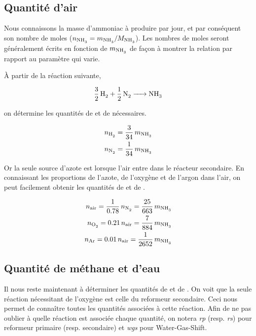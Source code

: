 \subsection{Quantité d'air}

Nous connaissons la masse d'ammoniac à produire par jour, 
et par conséquent son nombre de moles ($n_{\ce{NH3}} = m_{\ce{NH3}}/M_{\ce{NH3}}$).
Les nombres de moles seront généralement écrits en fonction de $m_{\ce{NH3}}$ 
de façon à montrer la relation par rapport au paramètre qui varie.

À partir de la réaction suivante,

\begin{equation*}
	\ce{\frac{3}{2} \, H2 + \frac{1}{2} \, N2 -> NH3} 
\end{equation*}

on détermine les quantités de  et de  nécessaires.

\begin{align}
	n_{\ce{H2}} = \frac{3}{34} \, m_{\ce{NH3}} 
	\label{eq:moles_H2} \\
	n_{\ce{N2}} = \frac{1}{34} \, m_{\ce{NH3}} \nonumber
\end{align}

Or la seule source d'azote est lorsque l'air entre dans le réacteur secondaire.
En connaissant les proportions de l'azote, de l'oxygène et de l'argon dans 
l'air, on peut facilement obtenir les quantités de  et de .

\begin{align*}
	n_{\text{air}} = \frac{1}{0.78} \, n_{\ce{N2}} = \frac{25}{663} \, m_{\ce{NH3}} \\
	n_{\ce{O2}} = 0.21 \, n_{\text{air}} = \frac{7}{884} \, m_{\ce{NH3}} \\
	n_{\ce{Ar}} = 0.01 \, n_{\text{air}} = \frac{1}{2652} \, m_{\ce{NH3}} 
\end{align*}

\subsection{Quantité de méthane et d'eau}

Il nous reste maintenant à déterminer les quantités de  et de .
On voit que la seule réaction nécessitant de l'oxygène est celle du 
reformeur secondaire. Ceci nous permet de conna\^itre toutes les quantités 
associées à cette réaction. 
Afin de ne pas oublier à quelle réaction est associée chaque quantité, 
on notera \textit{rp} (resp. \textit{rs}) pour reformeur primaire (resp. secondaire)
et \textit{wgs} pour Water-Gas-Shift.

